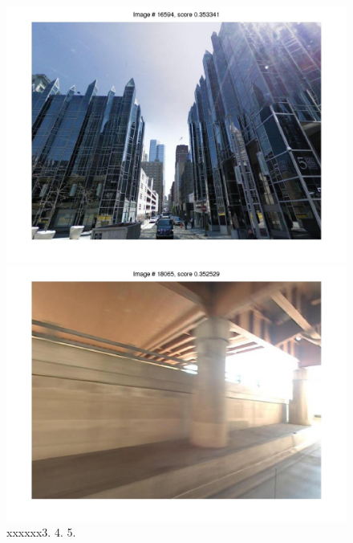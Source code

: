 \documentclass[10pt,onecolumn,A4]{article}
\begin{document}
\begin{figure}
\begin{minipage}{0.45\linewidth}
		\colorbox{myCopper4}{\includegraphics[trim = 55mm 40mm 55mm 30mm, clip=true,width=0.30\linewidth]{sup2961/svm04.jpg}}
		\colorbox{myCopper5}{\includegraphics[trim = 55mm 40mm 55mm 30mm, clip=true,width=0.30\linewidth]{sup2961/svm05.jpg}}  \\
		\textcolor{myWhite}{xxxxxx}3. \hspace{0.25\linewidth}4. \hspace{0.25\linewidth}5. \\
	\end{minipage}
\end{figure}
\end{document}
